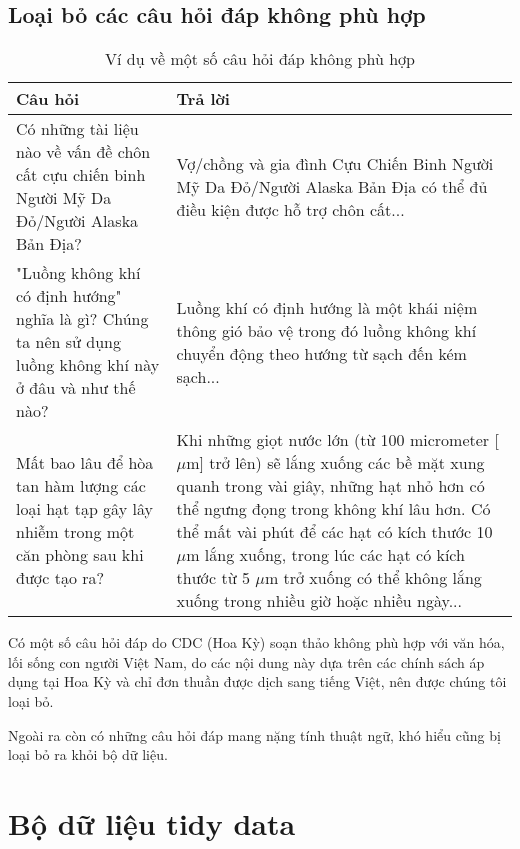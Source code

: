 \documentclass[runningheads]{llncs}
\begin{document}
\subsection{Loại bỏ các câu hỏi đáp không phù hợp}
\vspace{-0.4cm}
\begin{table}
	\setlength{\tabcolsep}{0.5em}
	\renewcommand{\arraystretch}{1.4}
	\begin{center}
	\caption{Ví dụ về một số câu hỏi đáp không phù hợp}\label{tab3}
		\begin{tabular}{ | p{5.75cm} | p{5.75cm} |} 
			\hline
    		\textbf{Câu hỏi} & \textbf{Trả lời}\\ 
			\hline
			Có những tài liệu nào về vấn đề chôn cất cựu chiến binh Người Mỹ Da Đỏ/Người Alaska Bản Địa? & Vợ/chồng và gia đình Cựu Chiến Binh Người Mỹ Da Đỏ/Người Alaska Bản Địa có thể đủ điều kiện được hỗ trợ chôn cất...\\ 
			\hline
				"Luồng không khí có định hướng" nghĩa là gì? Chúng ta nên sử dụng luồng không khí này ở đâu và như thế nào?& Luồng khí có định hướng là một khái niệm thông gió bảo vệ trong đó luồng không khí chuyển động theo hướng từ sạch đến kém sạch...\\
			\hline
				Mất bao lâu để hòa tan hàm lượng các loại hạt tạp gây lây nhiễm trong một căn phòng sau khi được tạo ra?& Khi những giọt nước lớn (từ 100 micrometer [$\mu$m] trở lên) sẽ lắng xuống các bề mặt xung quanh trong vài giây, những hạt nhỏ hơn có thể ngưng đọng trong không khí lâu hơn. Có thể mất vài phút để các hạt có kích thước 10 $\mu$m lắng xuống, trong lúc các hạt có kích thước từ 5 $\mu$m trở xuống có thể không lắng xuống trong nhiều giờ hoặc nhiều ngày...\\
			\hline
			\end{tabular}
		\end{center}
\end{table}
\vspace{-0.8cm}
Có một số câu hỏi đáp do CDC (Hoa Kỳ) soạn thảo không phù hợp với văn hóa, lối sống con người Việt Nam, do các nội dung này dựa trên các chính sách áp dụng tại Hoa Kỳ và chỉ đơn thuần được dịch sang tiếng Việt, nên được chúng tôi loại bỏ.

Ngoài ra còn có những câu hỏi đáp mang nặng tính thuật ngữ, khó hiểu cũng bị loại bỏ ra khỏi bộ dữ liệu.

\section{Bộ dữ liệu tidy data}
\end{document}
